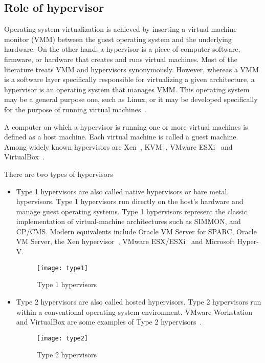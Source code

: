 \subsection{Role of hypervisor}
Operating system virtualization is achieved by inserting a virtual machine 
monitor (VMM) between the guest operating system and the underlying hardware. 
On the other hand, a hypervisor is a piece of computer software, firmware, or hardware
that creates and runs virtual machines.  Most of the literature treats VMM and
hypervisors synonymously. However, whereas a VMM is a software layer
specifically responsible for virtualizing a given architecture, a
hypervisor is an operating system that manages VMM. This operating
system may be a general purpose one, such as Linux, or it may
be developed specifically for the purpose of running virtual
machines~\cite{Agesen:2010:EXV:1899928.1899930}.

A computer on which a hypervisor is running one or more virtual
machines is defined as a host machine. Each virtual machine is
called a guest machine.  Among widely known
hypervisors are Xen~\cite{barham2003xen, Chisnall:2007:DGX:1407351},
KVM~\cite{Habib:2008:VK:1344209.1344217, kivity2007kvm},
VMware ESXi~\cite{Agesen:2010:EXV:1899928.1899930} and
VirtualBox~\cite{camargos2008virtualization}.

There are two types of hypervisors~\cite{Popek:1974:FRV:361011.361073}
\begin{itemize}
\item Type 1 hypervisors are also called native hypervisors or bare metal
hypervisors. Type 1 hypervisors run directly on the host's hardware
and manage guest operating systems. Type 1 hypervisors represent the
classic implementation of virtual-machine architectures such as SIMMON, %
and CP/CMS. Modern equivalents include Oracle VM Server for SPARC,
Oracle VM Server, the Xen hypervisor~\cite{barham2003xen}, VMware
ESX/ESXi~\cite{Agesen:2010:EXV:1899928.1899930} and Microsoft Hyper-V.

\begin{figure}[!ht]
\centering
\texttt{[image: type1]}
\caption{Type 1 hypervisors}
\label{Type 1 hypervisor}
\end{figure}
\item Type 2 hypervisors are also called hosted hypervisors. Type
2 hypervisors run within a conventional operating-system
environment. VMware Workstation and VirtualBox are some examples
of Type 2 hypervisors~\cite{Sugerman:2001:VID:647055.715774,
camargos2008virtualization}.

\begin{figure}[!ht]
\centering
\texttt{[image: type2]}
\caption{Type 2 hypervisors}
\label{fig:Type 2 hypervisor}
\end{figure}
\end{itemize}

